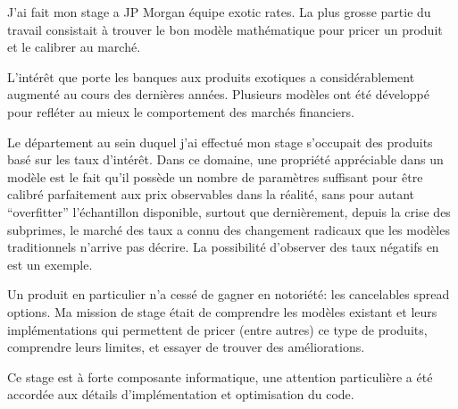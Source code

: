 J'ai fait mon stage a JP Morgan équipe exotic rates. La plus grosse partie du travail consistait à trouver le bon modèle mathématique pour pricer un produit et le calibrer au marché.

L'intérêt que porte les banques aux produits exotiques a considérablement augmenté au cours des dernières années. Plusieurs modèles ont été développé pour refléter au mieux le comportement des marchés financiers.

Le département au sein duquel j'ai effectué mon stage s'occupait des produits basé sur les taux d'intérêt. Dans ce domaine, une propriété appréciable dans un modèle est le fait qu'il possède un nombre de paramètres suffisant pour être calibré parfaitement aux prix observables dans la réalité, sans pour autant ``overfitter'' l'échantillon disponible, surtout que dernièrement, depuis la crise des subprimes, le marché des taux a connu des changement radicaux que les modèles traditionnels n'arrive pas décrire. La possibilité d'observer des taux négatifs en est un exemple. 

Un produit en particulier n'a cessé de  gagner en notoriété: les cancelables spread options. Ma mission de stage était de comprendre les modèles existant et leurs implémentations qui permettent de pricer (entre autres) ce type de produits, comprendre leurs limites, et essayer de trouver des améliorations.

Ce stage est à forte composante informatique, une attention particulière a été accordée aux détails d'implémentation et optimisation du code.
